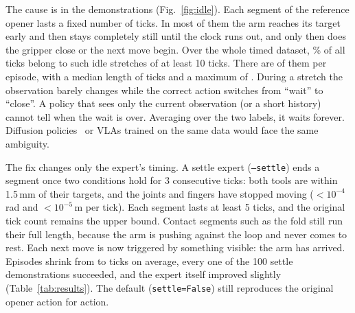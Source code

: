 \documentclass[10pt,twocolumn,letterpaper]{article}
\newcommand{\ttt}[1]{\texttt{\small #1}}
\begin{document}
The cause is in the demonstrations (Fig.~\ref{fig:idle}). Each segment of the reference opener lasts a fixed
number of ticks. In most of them the arm reaches its target early and then stays completely still until the
clock runs out, and only then does the gripper close or the next move begin. Over the whole timed dataset,
\TimedIdlePct\% of all ticks belong to such idle stretches of at least 10 ticks. There are \TimedIdleRuns{} of
them per episode, with a median length of \TimedIdleMedian{} ticks and a maximum of \TimedIdleMax. During a
stretch the observation barely changes while the correct action switches from ``wait'' to ``close''. A policy
that sees only the current observation (or a short history) cannot tell when the wait is over. Averaging over
the two labels, it waits forever. Diffusion policies~\cite{diffusion_policy} or VLAs trained on the same data
would face the same ambiguity.

The fix changes only the expert's timing. A settle expert (\ttt{--settle}) ends a segment once two conditions
hold for 3 consecutive ticks: both tools are within 1.5\,mm of their targets, and the joints and fingers have
stopped moving ($<10^{-4}$\,rad and $<10^{-5}$\,m per tick). Each segment lasts at least 5 ticks, and the
original tick count remains the upper bound. Contact segments such as the fold still run their full length,
because the arm is pushing against the loop and never comes to rest. Each next move is now triggered by
something visible: the arm has arrived. Episodes shrink from \TimedLen{} to \SettleLen{} ticks on average,
every one of the 100 settle demonstrations succeeded, and the expert itself improved slightly
(Table~\ref{tab:results}). The default (\ttt{settle=False}) still reproduces the original opener action for
action.
\end{document}
